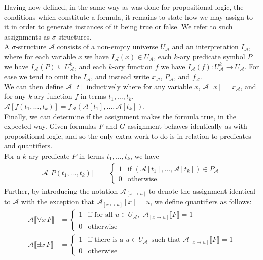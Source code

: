 \documentclass{tikzposter} %
\begin{document}
\begin{columns}
{    Having now defined, in the same way as was done for propositional logic, the conditions which constitute a formula, it remains to state how we may assign to it in order to generate instances of it being true or false. We refer to such assignments as $\sigma$-structures.\\

    A $\sigma$-structure $\mathcal{A}$ consists of a non-empty universe $U_{\mathcal{A}}$ and an interpretation $I_{\mathcal{A}}$, where for each variable $x$ we have $I_{\mathcal{A}}(x) \in U_{\mathcal{A}}$, each $k$-ary predicate symbol $P$ we have $I_{\mathcal{A}}(P) \subseteq U_{\mathcal{A}}^{k}$, and each $k$-ary function $f$ we have $I_{\mathcal{A}}(f) : U_{\mathcal{A}}^{k} \to U_{\mathcal{A}}$. For ease we tend to omit the $I_{\mathcal{A}}$, and instead write $x_{\mathcal{A}}$, $P_{\mathcal{A}}$, and $f_{\mathcal{A}}$. \\

    We can then define $\mathcal{A}[t]$ inductively where for any variable $x$, $\mathcal{A}[x] = x_{\mathcal{A}}$, and for any $k$-ary function $f$ in terms $t_{1},\dots,t_{k}$, $\mathcal{A}[f(t_{1}, \dots, t_{k})] = f_{\mathcal{A}}(\mathcal{A}[t_{1}], \dots, \mathcal{A}[t_{k}])$. \\

    Finally, we can determine if the assignment makes the formula true, in the expected way. Given formulas $F$ and $G$ assignment behaves identically as with propositional logic, and so the only extra work to do is in relation to predicates and quantifiers. \\

    For a $k$-ary predicate $P$ in terms $t_{1},\dots,t_{k}$, we have
    \begin{align*}
      \mathcal{A} \llbracket P(t_{1},\dots,t_{k}) \rrbracket &= \begin{cases}
        1 & \text{if } (\mathcal{A}[t_{1}],\dots,\mathcal{A}[t_{k}]) \in P_{\mathcal{A}} \\
        0 & \text{otherwise.}
      \end{cases}
    \end{align*}
    Further, by introducing the notation $\mathcal{A}_{[x \mapsto u]}$ to denote the assignment identical to $\mathcal{A}$ with the exception that $\mathcal{A}_{[x \mapsto u]}[x] = u$, we define quantifiers as follows:
    \begin{align*}
      \mathcal{A} \llbracket \forall x \, F \rrbracket &= \begin{cases}
        1 & \text{if for all } u \in U_{\mathcal{A}},\,\, \mathcal{A}_{[x \mapsto u]}\llbracket F \rrbracket = 1 \\
        0 & \text{otherwise}
      \end{cases} \\
       \mathcal{A} \llbracket \exists x \, F \rrbracket &= \begin{cases}
        1 & \text{if there is a } u \in U_{\mathcal{A}} \,\text{ such that } \mathcal{A}_{[x \mapsto u]}\llbracket F \rrbracket = 1 \\
        0 & \text{otherwise}
      \end{cases}
    \end{align*}

}
\end{columns}
\end{document}
